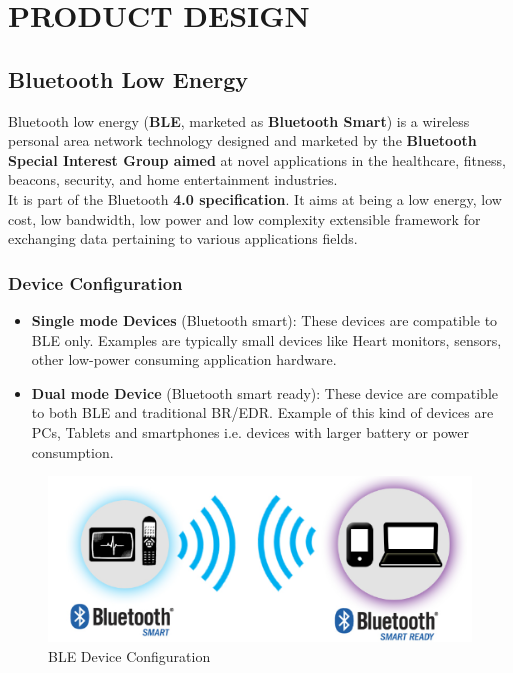 \chapter{PRODUCT DESIGN}
\section{Bluetooth Low Energy}
Bluetooth low energy (\textbf{BLE}, marketed as \textbf{Bluetooth Smart}) is a wireless personal area network technology designed and marketed by the \textbf{Bluetooth Special Interest Group aimed} at novel applications in the healthcare, fitness, beacons, security, and home entertainment industries. \\
It is part of the Bluetooth \textbf{4.0 specification}. It aims at being a low energy, low cost, low bandwidth, low power and low complexity extensible framework for exchanging data pertaining to various applications fields. 
\subsection{Device Configuration}
\begin{itemize}
	\item \textbf{Single mode Devices} (Bluetooth smart): These devices are compatible to BLE only. Examples are typically small devices like Heart monitors, sensors, other low-power consuming application hardware.
	\item \textbf{Dual mode Device} (Bluetooth smart ready): These device are compatible to both BLE and traditional BR/EDR. Example of this kind of devices are PCs, Tablets and smartphones i.e. devices with larger battery or power consumption.
\end{itemize}
\begin{figure}[ht]
	\centering
	\includegraphics[scale=0.5]{images/device_configuration.png}
	\caption{BLE Device Configuration}
\end{figure}
